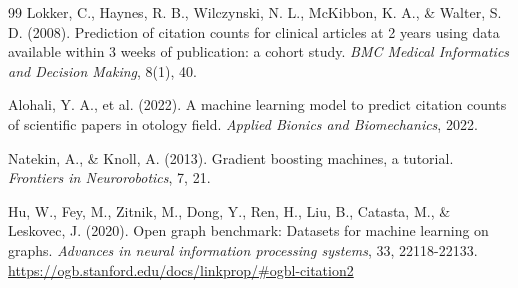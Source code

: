 \documentclass[11pt,a4paper]{article}
\begin{document}
\begin{thebibliography}{99}
Lokker, C., Haynes, R. B., Wilczynski, N. L., McKibbon, K. A., \& Walter, S. D. (2008). Prediction of citation counts for clinical articles at 2 years using data available within 3 weeks of publication: a cohort study. \textit{BMC Medical Informatics and Decision Making}, 8(1), 40.

Alohali, Y. A., et al. (2022). A machine learning model to predict citation counts of scientific papers in otology field. \textit{Applied Bionics and Biomechanics}, 2022.

Natekin, A., \& Knoll, A. (2013). Gradient boosting machines, a tutorial. \textit{Frontiers in Neurorobotics}, 7, 21.

Hu, W., Fey, M., Zitnik, M., Dong, Y., Ren, H., Liu, B., Catasta, M., \& Leskovec, J. (2020). Open graph benchmark: Datasets for machine learning on graphs. \textit{Advances in neural information processing systems}, 33, 22118-22133. \url{https://ogb.stanford.edu/docs/linkprop/#ogbl-citation2}

\end{thebibliography}
\end{document}
